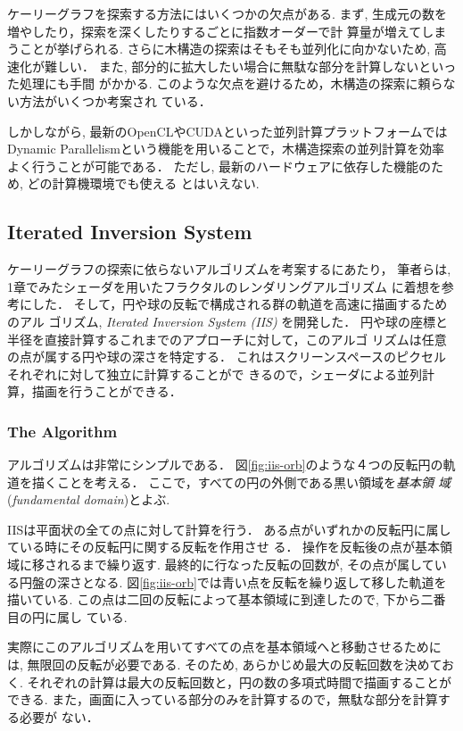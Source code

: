 ケーリーグラフを探索する方法にはいくつかの欠点がある.
まず, 生成元の数を増やしたり，探索を深くしたりするごとに指数オーダーで計
算量が増えてしまうことが挙げられる.
さらに木構造の探索はそもそも並列化に向かないため, 高速化が難しい．
また, 部分的に拡大したい場合に無駄な部分を計算しないといった処理にも手間
がかかる.
このような欠点を避けるため，木構造の探索に頼らない方法がいくつか考案され
ている．

しかしながら, 最新のOpenCLやCUDAといった並列計算プラットフォームでは
Dynamic Parallelismという機能を用いることで，木構造探索の並列計算を効率
よく行うことが可能である．
ただし, 最新のハードウェアに依存した機能のため, どの計算機環境でも使える
とはいえない.

\subsection{Iterated Inversion System}

ケーリーグラフの探索に依らないアルゴリズムを考案するにあたり，
筆者らは, 1章でみたシェーダを用いたフラクタルのレンダリングアルゴリズム
に着想を参考にした．
そして，円や球の反転で構成される群の軌道を高速に描画するためのアル
ゴリズム, \textit{Iterated Inversion System (IIS)}\cite{bridges2016-367}
を開発した．
円や球の座標と半径を直接計算するこれまでのアプローチに対して，このアルゴ
リズムは任意の点が属する円や球の深さを特定する．
これはスクリーンスペースのピクセルそれぞれに対して独立に計算することがで
きるので，シェーダによる並列計算，描画を行うことができる．

\subsubsection{The Algorithm}

アルゴリズムは非常にシンプルである．
図\ref{fig:iis-orb}のような４つの反転円の軌道を描くことを考える．
ここで，すべての円の外側である黒い領域を\emph{基本領
域}(\textit{fundamental domain})とよぶ.

IISは平面状の全ての点に対して計算を行う．
ある点がいずれかの反転円に属している時にその反転円に関する反転を作用させ
る．
操作を反転後の点が基本領域に移されるまで繰り返す.
最終的に行なった反転の回数が, その点が属している円盤の深さとなる.
図\ref{fig:iis-orb}では青い点を反転を繰り返して移した軌道を描いている.
この点は二回の反転によって基本領域に到達したので, 下から二番目の円に属し
ている.

実際にこのアルゴリズムを用いてすべての点を基本領域へと移動させるためには,
無限回の反転が必要である. そのため, あらかじめ最大の反転回数を決めておく.
それぞれの計算は最大の反転回数と，円の数の多項式時間で描画することができる.
また，画面に入っている部分のみを計算するので，無駄な部分を計算する必要が
ない．

